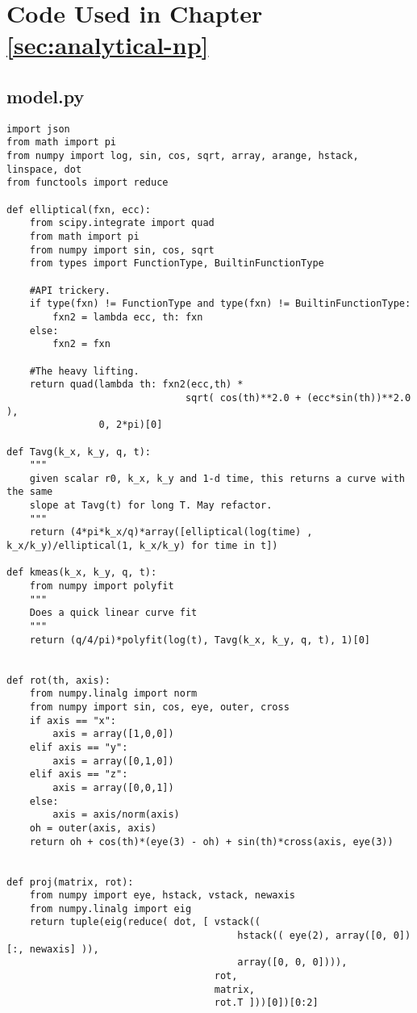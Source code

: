 \chapter{Code Used in Chapter \ref{sec:analytical-np}}
\label{apx:analytical-np}

\section{model.py}

\small
\begin{verbatim}
import json
from math import pi
from numpy import log, sin, cos, sqrt, array, arange, hstack, linspace, dot
from functools import reduce

def elliptical(fxn, ecc):
    from scipy.integrate import quad
    from math import pi
    from numpy import sin, cos, sqrt
    from types import FunctionType, BuiltinFunctionType

    #API trickery.
    if type(fxn) != FunctionType and type(fxn) != BuiltinFunctionType:
        fxn2 = lambda ecc, th: fxn
    else:
        fxn2 = fxn

    #The heavy lifting.
    return quad(lambda th: fxn2(ecc,th) *
                               sqrt( cos(th)**2.0 + (ecc*sin(th))**2.0 ),
                0, 2*pi)[0]

def Tavg(k_x, k_y, q, t):
    """
    given scalar r0, k_x, k_y and 1-d time, this returns a curve with the same 
    slope at Tavg(t) for long T. May refactor.
    """
    return (4*pi*k_x/q)*array([elliptical(log(time) , k_x/k_y)/elliptical(1, k_x/k_y) for time in t])

def kmeas(k_x, k_y, q, t):
    from numpy import polyfit
    """
    Does a quick linear curve fit 
    """
    return (q/4/pi)*polyfit(log(t), Tavg(k_x, k_y, q, t), 1)[0]


def rot(th, axis):
    from numpy.linalg import norm
    from numpy import sin, cos, eye, outer, cross
    if axis == "x":
        axis = array([1,0,0])
    elif axis == "y":
        axis = array([0,1,0])
    elif axis == "z":
        axis = array([0,0,1])
    else:
        axis = axis/norm(axis)
    oh = outer(axis, axis)
    return oh + cos(th)*(eye(3) - oh) + sin(th)*cross(axis, eye(3))
    

def proj(matrix, rot):
    from numpy import eye, hstack, vstack, newaxis
    from numpy.linalg import eig
    return tuple(eig(reduce( dot, [ vstack((
                                        hstack(( eye(2), array([0, 0])[:, newaxis] )),
                                        array([0, 0, 0]))),
                                    rot,
                                    matrix,
                                    rot.T ]))[0])[0:2]



\end{verbatim}
